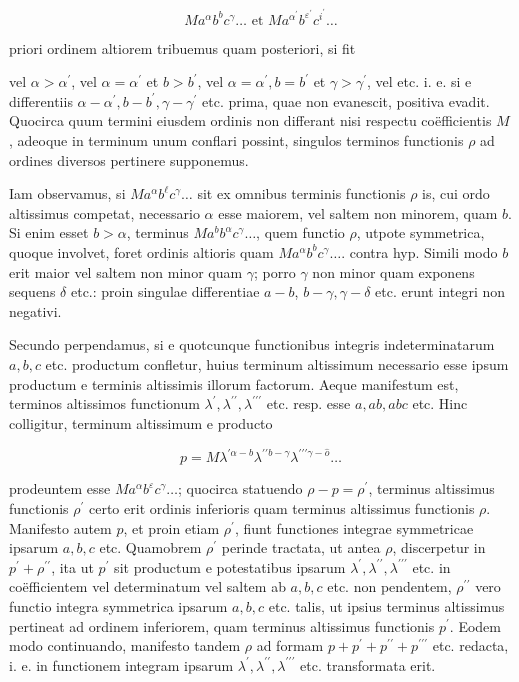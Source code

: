 \documentclass[10pt]{article}
\begin{document}
\[
M a^{\alpha} b^{b} c^{\gamma} \ldots \text { et } M a^{\alpha^{\prime}} b^{\varepsilon^{\prime}} c^{i^{\prime}} \ldots
\]

priori ordinem altiorem tribuemus quam posteriori, si fit

vel \(\alpha>\alpha^{\prime}\), vel \(\alpha=\alpha^{\prime}\) et \(b>b^{\prime}\), vel \(\alpha=\alpha^{\prime}, b=b^{\prime}\) et \(\gamma>\gamma^{\prime}\), vel etc.
i. e. si e differentiis \(\alpha-\alpha^{\prime}, b-b^{\prime}, \gamma-\gamma^{\prime}\) etc. prima, quae non evanescit, positiva evadit. Quocirca quum termini eiusdem ordinis non differant nisi respectu coëfficientis \(M\), adeoque in terminum unum conflari possint, singulos terminos functionis \(\rho\) ad ordines diversos pertinere supponemus.

Iam observamus, si \(M a^{\alpha} b^{\ell} c^{\gamma} \ldots\) sit ex omnibus terminis functionis \(\rho\) is, cui ordo altissimus competat, necessario \(\alpha\) esse maiorem, vel saltem non minorem, quam \(b\). Si enim esset \(b>\alpha\), terminus \(M a^{b} b^{\alpha} c^{\gamma} \ldots\), quem functio \(\rho\), utpote symmetrica, quoque involvet, foret ordinis altioris quam \(M a^{\alpha} b^{b} c^{\gamma} \ldots\). contra hyp. Simili modo \(b\) erit maior vel saltem non minor quam \(\gamma\); porro \(\gamma\) non minor quam exponens sequens \(\delta\) etc.: proin singulae differentiae \(a-b\), \(b-\gamma, \gamma-\delta\) etc. erunt integri non negativi.

Secundo perpendamus, si e quotcunque functionibus integris indeterminatarum \(a, b, c\) etc. productum confletur, huius terminum altissimum necessario esse ipsum productum e terminis altissimis illorum factorum. Aeque manifestum est, terminos altissimos functionum \(\lambda^{\prime}, \lambda^{\prime \prime}, \lambda^{\prime \prime \prime}\) etc. resp. esse \(a, a b, a b c\) etc. Hinc colligitur, terminum altissimum e producto

\[
p=M \lambda^{\prime \alpha-b} \lambda^{\prime \prime b-\gamma} \lambda^{\prime \prime \prime \gamma-\hat{o}} \ldots
\]

prodeuntem esse \(M a^{\alpha} b^{\varepsilon} c^{\gamma} \ldots\); quocirca statuendo \(\rho-p=\rho^{\prime}\), terminus altissimus functionis \(\rho^{\prime}\) certo erit ordinis inferioris quam terminus altissimus functionis \(\rho\). Manifesto autem \(p\), et proin etiam \(\rho^{\prime}\), fiunt functiones integrae symmetricae ipsarum \(a, b, c\) etc. Quamobrem \(\rho^{\prime}\) perinde tractata, ut antea \(\rho\), discerpetur in \(p^{\prime}+\rho^{\prime \prime}\), ita ut \(p^{\prime}\) sit productum e potestatibus ipsarum \(\lambda^{\prime}, \lambda^{\prime \prime}, \lambda^{\prime \prime \prime}\) etc. in coëfficientem vel determinatum vel saltem ab \(a, b, c\) etc. non pendentem, \(\rho^{\prime \prime}\) vero functio integra symmetrica ipsarum \(a, b, c\) etc. talis, ut ipsius terminus altissimus pertineat ad ordinem inferiorem, quam terminus altissimus functionis \(p^{\prime}\). Eodem modo continuando, manifesto tandem \(\rho\) ad formam \(p+p^{\prime}+p^{\prime \prime}+p^{\prime \prime \prime}\) etc. redacta, i. e. in functionem integram ipsarum \(\lambda^{\prime}, \lambda^{\prime \prime}, \lambda^{\prime \prime \prime}\) etc. transformata erit.
\end{document}
